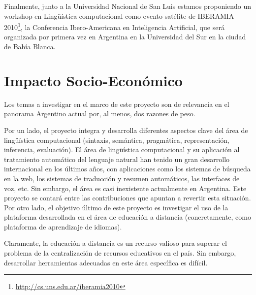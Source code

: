 \documentclass[11pt]{article}
\begin{document}
Finalmente, junto a la Universidad Nacional de San Luis estamos proponiendo un
workshop en Ling\"u\'istica computacional como evento sat\'elite de IBERAMIA
2010\footnote{\url{http://cs.uns.edu.ar/iberamia2010}}, 
la Conferencia Ibero-Americana en Inteligencia Artificial, que ser\'a
organizada por primera vez en Argentina en la Universidad del Sur
en la ciudad de Bah\'ia Blanca.            


\section{Impacto Socio-Econ\'omico} \label{economico}

Los temas a investigar en el marco de este proyecto son de relevancia en el
panorama Argentino actual por, al menos, dos razones de peso.

Por un lado, el proyecto
integra y desarrolla diferentes aspectos clave del \'area de ling\"u\'istica
computacional (sintaxis, sem\'antica, pragm\'atica, representaci\'on,
inferencia, evaluaci\'on). El \'area de ling\"u\'istica computacional y su
aplicaci\'on al tratamiento autom\'atico del lenguaje natural han tenido un
gran desarrollo internacional en los \'ultimos a\~nos, con aplicaciones como los
sistemas de b\'usqueda en la web, los sistemas de traducci\'on y resumen
autom\'aticos, las interfaces de voz, etc. Sin embargo, el \'area es casi
inexistente actualmente en Argentina. Este proyecto se contar\'a entre 
las contribuciones que apuntan a revertir esta situaci\'on.
Por otro lado, el objetivo \'ultimo de este proyecto es investigar el uso de la
plataforma
desarrollada en el \'area de educaci\'on a distancia (concretamente, como
plataforma de aprendizaje de idiomas).

Claramente, la educaci\'on a distancia es un recurso valioso para superar el 
problema de la centralizaci\'on de recursos
educativos en el pa\'is. Sin embargo, desarrollar herramientas adecuadas en
este \'area espec\'ifica es dif\'icil.
\end{document}

